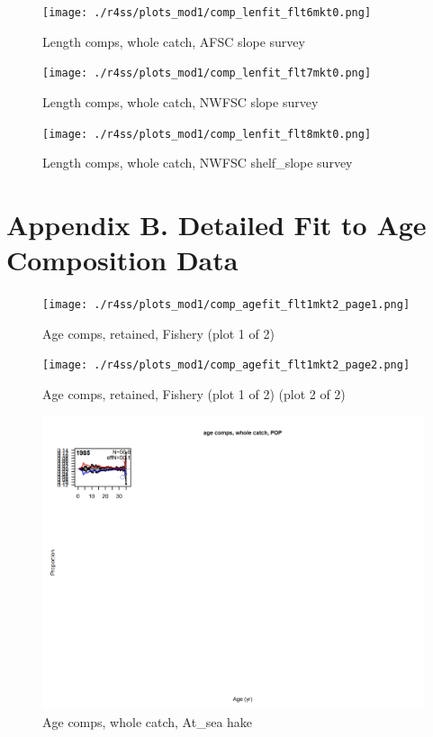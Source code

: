 \documentclass[12pt,]{article}
\begin{document}
\begin{figure}
\centering
\texttt{[image: ./r4ss/plots\_mod1/comp\_lenfit\_flt6mkt0.png]}
\caption{Length comps, whole catch, AFSC slope survey
\label{fig:length_fits}}
\end{figure}

\begin{figure}
\centering
\texttt{[image: ./r4ss/plots\_mod1/comp\_lenfit\_flt7mkt0.png]}
\caption{Length comps, whole catch, NWFSC slope survey
\label{fig:length_fits}}
\end{figure}

\begin{figure}
\centering
\texttt{[image: ./r4ss/plots\_mod1/comp\_lenfit\_flt8mkt0.png]}
\caption{Length comps, whole catch, NWFSC shelf\_slope survey
\label{fig:length_fits}}
\end{figure}

\FloatBarrier

\section{Appendix B. Detailed Fit to Age Composition
Data}\label{appendix-b.-detailed-fit-to-age-composition-data}

\begin{figure}
\centering
\texttt{[image: ./r4ss/plots\_mod1/comp\_agefit\_flt1mkt2\_page1.png]}
\caption{Age comps, retained, Fishery (plot 1 of 2)
\label{fig:age_fits}}
\end{figure}

\begin{figure}
\centering
\texttt{[image: ./r4ss/plots\_mod1/comp\_agefit\_flt1mkt2\_page2.png]}
\caption{Age comps, retained, Fishery (plot 1 of 2) (plot 2 of 2)
\label{fig:age_fits}}
\end{figure}

\begin{figure}
\centering
\includegraphics{./r4ss/plots_mod1/comp_agefit_flt2mkt0.png}
\caption{Age comps, whole catch, At\_sea hake \label{fig:age_fits}}
\end{figure}
\end{document}
